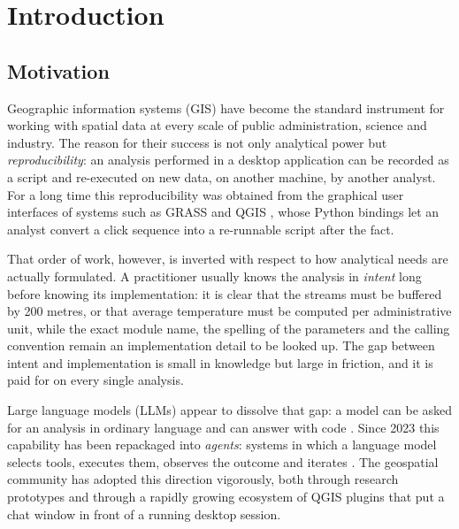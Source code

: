 \chapter{Introduction}
\label{ch:introduction}

\section{Motivation}

Geographic information systems (GIS) have become the standard instrument for
working with spatial data at every scale of public administration, science and
industry. The reason for their success is not only analytical power but
\emph{reproducibility}: an analysis performed in a desktop application can be
recorded as a script and re-executed on new data, on another machine, by
another analyst. For a long time this reproducibility was obtained from the
graphical user interfaces of systems such as GRASS \cite{neteler2012grass} and
QGIS \cite{qgissoftware}, whose Python bindings \cite{pyqgis,grass_tools} let
an analyst convert a click sequence into a re-runnable script after the fact.

That order of work, however, is inverted with respect to how analytical needs
are actually formulated. A practitioner usually knows the analysis in
\emph{intent} long before knowing its implementation: it is clear that the
streams must be buffered by 200 metres, or that average temperature must be
computed per administrative unit, while the exact module name, the spelling of
the parameters and the calling convention remain an implementation detail to be
looked up. The gap between intent and implementation is small in knowledge but
large in friction, and it is paid for on every single analysis.

Large language models (LLMs) appear to dissolve that gap: a model can be asked
for an analysis in ordinary language and can answer with code
\cite{vaswani2017attention,chen2021codex}. Since 2023 this capability has been
repackaged into \emph{agents}: systems in which a language model selects tools,
executes them, observes the outcome and iterates \cite{yao2023react}. The
geospatial community has adopted this direction vigorously, both through
research prototypes \cite{zhang2023geogpt,zhang2024geollmtooluse,singh2024geollmengine}
and through a rapidly growing ecosystem of QGIS plugins that put a chat window
in front of a running desktop session.


